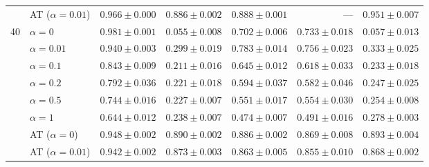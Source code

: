 \begin{tabular}{@{}llrrrrr@{}}
 & AT ($\alpha{=}0.01$) & $0.966 \pm 0.000$ & $0.886 \pm 0.002$ & $0.888 \pm 0.001$ & --- & $0.951 \pm 0.007$ \\
\cmidrule(lr){1-7}
\multirow{8}{*}{40} & $\alpha{=}0$ & $\mathbf{0.981 \pm 0.001}$ & $0.055 \pm 0.008$ & $0.702 \pm 0.006$ & $0.733 \pm 0.018$ & $0.057 \pm 0.013$ \\
 & $\alpha{=}0.01$ & $0.940 \pm 0.003$ & $0.299 \pm 0.019$ & $0.783 \pm 0.014$ & $0.756 \pm 0.023$ & $0.333 \pm 0.025$ \\
 & $\alpha{=}0.1$ & $0.843 \pm 0.009$ & $0.211 \pm 0.016$ & $0.645 \pm 0.012$ & $0.618 \pm 0.033$ & $0.233 \pm 0.018$ \\
 & $\alpha{=}0.2$ & $0.792 \pm 0.036$ & $0.221 \pm 0.018$ & $0.594 \pm 0.037$ & $0.582 \pm 0.046$ & $0.247 \pm 0.025$ \\
 & $\alpha{=}0.5$ & $0.744 \pm 0.016$ & $0.227 \pm 0.007$ & $0.551 \pm 0.017$ & $0.554 \pm 0.030$ & $0.254 \pm 0.008$ \\
 & $\alpha{=}1$ & $0.644 \pm 0.012$ & $0.238 \pm 0.007$ & $0.474 \pm 0.007$ & $0.491 \pm 0.016$ & $0.278 \pm 0.003$ \\
 & AT ($\alpha{=}0$) & $0.948 \pm 0.002$ & $0.890 \pm 0.002$ & $0.886 \pm 0.002$ & $\mathbf{0.869 \pm 0.008}$ & $0.893 \pm 0.004$ \\
 & AT ($\alpha{=}0.01$) & $0.942 \pm 0.002$ & $0.873 \pm 0.003$ & $0.863 \pm 0.005$ & $0.855 \pm 0.010$ & $0.868 \pm 0.002$ \\
\bottomrule
\end{tabular}
